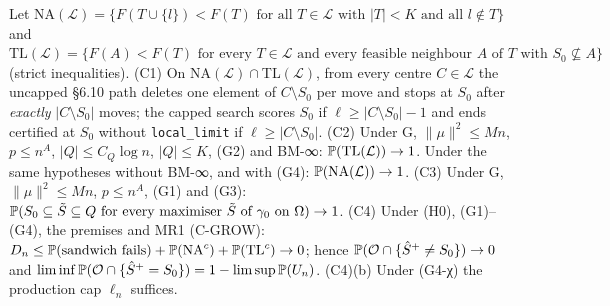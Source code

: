 \begin{theorem}[GROW]\label{thm:GROW}
Let $\mathrm{NA}(\mathcal L)=\{F(T\cup\{l\})<F(T)\text{ for all }T\in\mathcal L\text{ with }|T|<K\text{ and all }l\notin T\}$ and $\mathrm{TL}(\mathcal L)=\{F(A)<F(T)\text{ for every }T\in\mathcal L\text{ and every feasible neighbour }A\text{ of }T\text{ with }S_0\not\subseteq A\}$ (strict inequalities). (C1) On NA$(\mathcal L)\cap$TL$(\mathcal L)$, from every centre $C\in\mathcal L$ the uncapped §6.10 path deletes one element of $C\setminus S_0$ per move and stops at $S_0$ after \emph{exactly} $|C\setminus S_0|$ moves; the capped search scores $S_0$ if $\ell\ge|C\setminus S_0|-1$ and ends certified at $S_0$ without \texttt{local\_limit} if $\ell\ge|C\setminus S_0|$. (C2) Under G, $\|\mu\|^2\le Mn$, $p\le n^A$, $|Q|\le C_Q\log n$, $|Q|\le K$, (G2) and BM-∞: $\mathbb P(\mathrm{TL}(\mathcal L))\to1$. Under the same hypotheses without BM-∞, and with (G4): $\mathbb P(\mathrm{NA}(\mathcal L))\to1$. (C3) Under G, $\|\mu\|^2\le Mn$, $p\le n^A$, (G1) and (G3): $\mathbb P(S_0\subseteq\tilde{S}\subseteq Q\text{ for every maximiser }\tilde{S}\text{ of }\gamma_0\text{ on }\Omega)\to1$. (C4) Under (H0), (G1)--(G4), the premises and MR1 (C-GROW): $D_n\le\mathbb P(\text{sandwich fails})+\mathbb P(\mathrm{NA}^c)+\mathbb P(\mathrm{TL}^c)\to0$; hence $\mathbb P(\mathcal O\cap\{\hat S^{+}\ne S_0\})\to0$ and $\liminf\mathbb P(\mathcal O\cap\{\hat S^{+}=S_0\})=1-\limsup\mathbb P(U_n)$. (C4)(b) Under (G4-χ) the production cap $\ell_n$ suffices.
\end{theorem}
